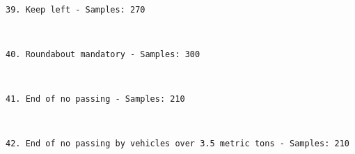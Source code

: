 \documentclass[11pt]{article}
\begin{document}
    \begin{center}
    \end{center}
    { \hspace*{\fill} \\}
    
    \begin{Verbatim}[commandchars=\\\{\}]
39. Keep left - Samples: 270

    \end{Verbatim}

    \begin{center}
    \end{center}
    { \hspace*{\fill} \\}
    
    \begin{Verbatim}[commandchars=\\\{\}]
40. Roundabout mandatory - Samples: 300

    \end{Verbatim}

    \begin{center}
    \end{center}
    { \hspace*{\fill} \\}
    
    \begin{Verbatim}[commandchars=\\\{\}]
41. End of no passing - Samples: 210

    \end{Verbatim}

    \begin{center}
    \end{center}
    { \hspace*{\fill} \\}
    
    \begin{Verbatim}[commandchars=\\\{\}]
42. End of no passing by vehicles over 3.5 metric tons - Samples: 210

    \end{Verbatim}
\end{document}
